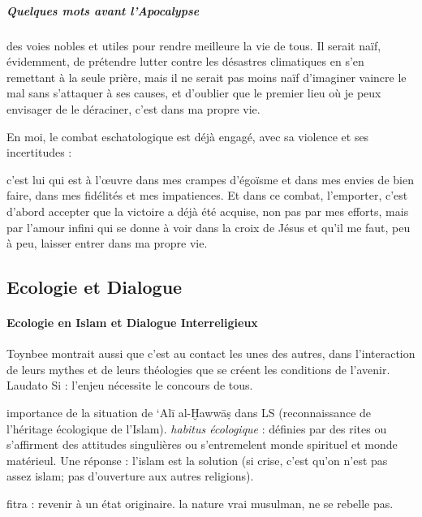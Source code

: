 \subparagraph{Quelques mots avant l'Apocalypse}
\begin{singlequote}
        
des voies nobles et utiles pour rendre meilleure la vie de tous. Il serait naïf, évidemment, de prétendre lutter contre les désastres climatiques en s'en remettant à la seule prière, mais il ne serait pas moins naïf d'imaginer vaincre le mal sans s'attaquer à ses causes, et d'oublier que le premier lieu où je peux envisager de le déraciner, c'est dans ma propre vie.

En moi, le combat eschatologique est déjà engagé, avec sa violence et ses incertitudes :

c'est lui qui est à l'œuvre dans mes crampes d’égoïsme et dans mes envies de bien faire, dans mes fidélités et mes impatiences. Et dans ce combat, l'emporter, c'est d'abord accepter que la victoire a déjà été acquise, non pas par mes efforts, mais par l'amour infini qui se donne à voir dans la croix de Jésus et qu'il me faut, peu à peu, laisser entrer dans ma propre vie.
\end{singlequote}


\subsection{Ecologie et Dialogue}
\paragraph{Ecologie en Islam et Dialogue Interreligieux} \cite{pisani_ecologie_2016} 
    Toynbee montrait aussi que c’est au contact les unes des autres, dans l’interaction de leurs mythes et de leurs théologies que se créent les conditions de l’avenir.
    Laudato Si : l'enjeu nécessite le concours de tous.
   
    importance de la situation de ‘Alī al-Ḫawwāṣ dans LS (reconnaissance de l'héritage écologique de l'Islam).     
    \textit{habitus écologique} : définies par des rites ou s'affirment des attitudes singulières ou s'entremelent monde spirituel et monde matérieul. 
    Une réponse : l’islam est la solution (si crise, c'est qu'on n'est pas assez islam; pas d'ouverture aux autres religions).
    
    fitra : revenir à un état originaire. la nature vrai musulman, ne se rebelle pas.
    
 
    

  

    
